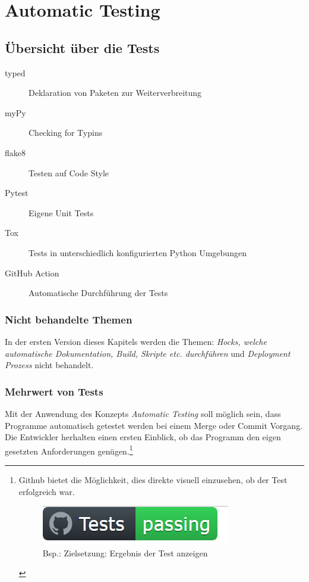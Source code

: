 \section{Automatic Testing}

\subsection{Übersicht über die Tests}

\begin{description}
	\item[typed] Deklaration von Paketen zur Weiterverbreitung
	\item[myPy] Checking for Typins
	\item[flake8] Testen auf Code Style
	\item[Pytest] Eigene Unit Tests
	\item[Tox] Tests in unterschiedlich konfigurierten Python Umgebungen
	\item[GitHub Action] Automatische Durchführung der Tests
\end{description}
	
\subsubsection{Nicht behandelte Themen}
In der ersten Version dieses Kapitels werden die Themen: \textit{Hocks, welche automatische Dokumentation, Build, Skripte etc. durchführen} und \textit{Deployment Prozess} nicht behandelt.

\subsubsection{Mehrwert von Tests}
Mit der Anwendung des Konzepts \textit{Automatic Testing} soll möglich sein, dass Programme automatisch getestet werden bei einem Merge oder Commit Vorgang. Die Entwickler herhalten einen ersten Einblick, ob das Programm den eigen gesetzten Anforderungen genügen.\footnote{
 Github bietet die Möglichkeit, dies direkte visuell einzusehen, ob der Test erfolgreich war.
\begin{figure}[H]
	\centering
	\includegraphics[scale = 0.6]{attachment/chapter_2/Scc073}
	\caption{Bsp.: Zielsetzung: Ergebnis der Test anzeigen}
\end{figure}
}

